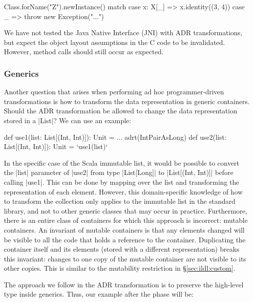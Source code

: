 \label{sec:ildl:language-dynamically-loaded-code}

\begin{lstlisting-nobreak}
Class.forName("Z").newInstance() match {
  case x: X[_] => x.identity((3, 4))
  case _ => throw new Exception("...")
}
\end{lstlisting-nobreak}

We have not tested the Java Native Interface (JNI) with ADR transformations, but expect the object layout assumptions in the C code to be invalidated. However, method calls should still occur as expected.

\subsubsection*{Generics}
\label{sec:ildl:language-generics}

Another question that arises when performing ad hoc programmer-driven transformations is how to transform the data representation in generic containers. Should the ADR transformation be allowed to change the data representation stored in a |List|? We can use an example:

\begin{lstlisting-nobreak}
def use1(list: List[(Int, Int)]): Unit = ...
adrt(IntPairAsLong) {
  def use2(list: List[(Int, Int)]): Unit = `use1(list)`
}
\end{lstlisting-nobreak}

In the specific case of the Scala immutable list, it would be possible to convert the |list| parameter of |use2| from type |List[Long]| to |List[(Int, Int)]| before calling |use1|. This can be done by mapping over the list and transforming the representation of each element. However, this domain-specific knowledge of how to transform the collection only applies to the immutable list in the standard library, and not to other generic classes that may occur in practice. Furthermore, there is an entire class of containers for which this approach is incorrect: mutable containers. An invariant of mutable containers is that any elements changed will be visible to all the code that holds a reference to the container. Duplicating the container itself and its elements (stored with a different representation) breaks this invariant: changes to one copy of the mutable container are not visible to its other copies. This is similar to the mutability restriction in \S\ref{sec:ildl:custom}.

The approach we follow in the ADR transformation is to preserve the high-level type inside generics. Thus, our example after the \commit{} phase will be:

